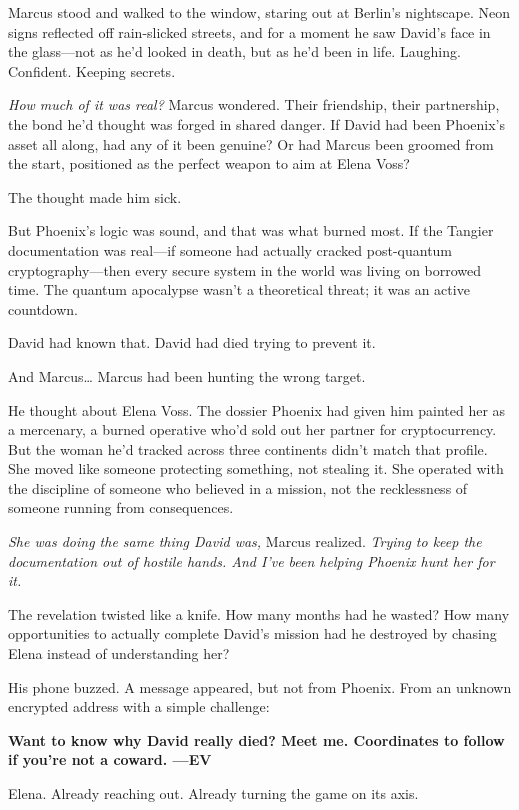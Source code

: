 \documentclass[12pt,letterpaper]{book}
\begin{document}
Marcus stood and walked to the window, staring out at Berlin's nightscape. Neon signs reflected off rain-slicked streets, and for a moment he saw David's face in the glass---not as he'd looked in death, but as he'd been in life. Laughing. Confident. Keeping secrets.

\emph{How much of it was real?} Marcus wondered. Their friendship, their partnership, the bond he'd thought was forged in shared danger. If David had been Phoenix's asset all along, had any of it been genuine? Or had Marcus been groomed from the start, positioned as the perfect weapon to aim at Elena Voss?

The thought made him sick.

But Phoenix's logic was sound, and that was what burned most. If the Tangier documentation was real---if someone had actually cracked post-quantum cryptography---then every secure system in the world was living on borrowed time. The quantum apocalypse wasn't a theoretical threat; it was an active countdown.

David had known that. David had died trying to prevent it.

And Marcus\ldots{} Marcus had been hunting the wrong target.

He thought about Elena Voss. The dossier Phoenix had given him painted her as a mercenary, a burned operative who'd sold out her partner for cryptocurrency. But the woman he'd tracked across three continents didn't match that profile. She moved like someone protecting something, not stealing it. She operated with the discipline of someone who believed in a mission, not the recklessness of someone running from consequences.

\emph{She was doing the same thing David was,} Marcus realized. \emph{Trying to keep the documentation out of hostile hands. And I've been helping Phoenix hunt her for it.}

The revelation twisted like a knife. How many months had he wasted? How many opportunities to actually complete David's mission had he destroyed by chasing Elena instead of understanding her?

His phone buzzed. A message appeared, but not from Phoenix. From an unknown encrypted address with a simple challenge:

\textbf{Want to know why David really died? Meet me. Coordinates to follow if you're not a coward. ---EV}

Elena. Already reaching out. Already turning the game on its axis.
\end{document}
